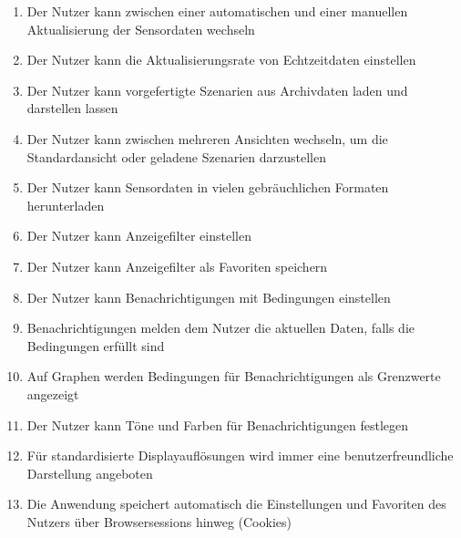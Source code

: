 \begin{enumerate}[label=\textbf{WK\arabic{enumi}0}]
	\item Der Nutzer kann zwischen einer automatischen und einer manuellen Aktualisierung der Sensordaten wechseln
	\item Der Nutzer kann die Aktualisierungsrate von Echtzeitdaten einstellen
	\item Der Nutzer kann vorgefertigte Szenarien aus Archivdaten laden und darstellen lassen
	\item Der Nutzer kann zwischen mehreren Ansichten wechseln, um die Standardansicht oder geladene Szenarien darzustellen
	\item Der Nutzer kann Sensordaten in vielen gebräuchlichen Formaten herunterladen
	\item Der Nutzer kann Anzeigefilter einstellen
	\item Der Nutzer kann Anzeigefilter als Favoriten speichern
	\item Der Nutzer kann Benachrichtigungen mit Bedingungen einstellen
	\item Benachrichtigungen melden dem Nutzer die aktuellen Daten, falls die Bedingungen erfüllt sind
	\item Auf Graphen werden Bedingungen für Benachrichtigungen als Grenzwerte angezeigt
	\item Der Nutzer kann Töne und Farben für Benachrichtigungen festlegen
	\item Für standardisierte Displayauflösungen wird immer eine benutzerfreundliche Darstellung angeboten
	\item Die Anwendung speichert automatisch die Einstellungen und Favoriten des Nutzers über Browsersessions hinweg (Cookies)
	
\end{enumerate}

